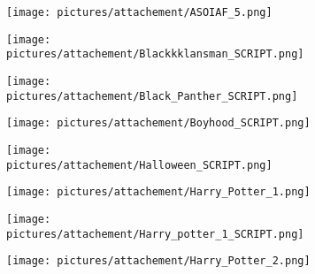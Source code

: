 \begin{figure} \ContinuedFloat
        \centering
        \begin{subfigure}{.49\textwidth}
                \centering
                \texttt{[image: pictures/attachement/ASOIAF\_5.png]}
        \end{subfigure}
        \begin{subfigure}{.49\textwidth}
                \centering
                \texttt{[image: pictures/attachement/Blackkklansman\_SCRIPT.png]}
        \end{subfigure}
\end{figure}
\begin{figure} \ContinuedFloat
        \centering
        \begin{subfigure}{.49\textwidth}
                \centering
                \texttt{[image: pictures/attachement/Black\_Panther\_SCRIPT.png]}
        \end{subfigure}
        \begin{subfigure}{.49\textwidth}
                \centering
                \texttt{[image: pictures/attachement/Boyhood\_SCRIPT.png]}
        \end{subfigure}
\end{figure}
\begin{figure} \ContinuedFloat
        \centering
        \begin{subfigure}{.49\textwidth}
                \centering
                \texttt{[image: pictures/attachement/Halloween\_SCRIPT.png]}
        \end{subfigure}
        \begin{subfigure}{.49\textwidth}
                \centering
                \texttt{[image: pictures/attachement/Harry\_Potter\_1.png]}
        \end{subfigure}
\end{figure}
\begin{figure} \ContinuedFloat
        \centering
        \begin{subfigure}{.49\textwidth}
                \centering
                \texttt{[image: pictures/attachement/Harry\_potter\_1\_SCRIPT.png]}
        \end{subfigure}
        \begin{subfigure}{.49\textwidth}
                \centering
                \texttt{[image: pictures/attachement/Harry\_Potter\_2.png]}
        \end{subfigure}
\end{figure}
